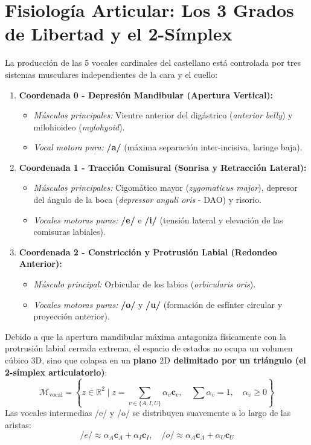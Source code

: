 \documentclass[11pt,a4paper,openany]{book}
\theoremstyle{definition}
\begin{document}
\section{Fisiología Articular: Los 3 Grados de Libertad y el 2-Símplex}
\label{sec:grados_libertad}

La producción de las 5 vocales cardinales del castellano está controlada por tres sistemas musculares independientes de la cara y el cuello:

\begin{enumerate}
    \item \textbf{Coordenada 0 - Depresión Mandibular (Apertura Vertical):}
    \begin{itemize}
        \item \textit{Músculos principales:} Vientre anterior del digástrico (\textit{anterior belly}) y milohioideo (\textit{mylohyoid}).
        \item \textit{Vocal motora pura:} \textbf{/a/} (máxima separación inter-incisiva, laringe baja).
    \end{itemize}
    \item \textbf{Coordenada 1 - Tracción Comisural (Sonrisa y Retracción Lateral):}
    \begin{itemize}
        \item \textit{Músculos principales:} Cigomático mayor (\textit{zygomaticus major}), depresor del ángulo de la boca (\textit{depressor anguli oris} - DAO) y risorio.
        \item \textit{Vocales motoras puras:} \textbf{/e/} e \textbf{/i/} (tensión lateral y elevación de las comisuras labiales).
    \end{itemize}
    \item \textbf{Coordenada 2 - Constricción y Protrusión Labial (Redondeo Anterior):}
    \begin{itemize}
        \item \textit{Músculo principal:} Orbicular de los labios (\textit{orbicularis oris}).
        \item \textit{Vocales motoras puras:} \textbf{/o/} y \textbf{/u/} (formación de esfínter circular y proyección anterior).
    \end{itemize}
\end{enumerate}

Debido a que la apertura mandibular máxima antagoniza físicamente con la protrusión labial cerrada extrema, el espacio de estados no ocupa un volumen cúbico $3\text{D}$, sino que colapsa en un \textbf{plano $2\text{D}$ delimitado por un triángulo (el 2-símplex articulatorio)}:
\begin{equation}
\mathcal{M}_{\text{vocal}} = \left\{ z \in \mathbb{R}^2 \mid z = \sum_{v \in \{A, I, U\}} \alpha_v \mathbf{c}_v, \quad \sum \alpha_v = 1, \quad \alpha_v \ge 0 \right\}
\end{equation}
Las vocales intermedias /e/ y /o/ se distribuyen suavemente a lo largo de las aristas:
$$/e/ \approx \alpha_A \mathbf{c}_A + \alpha_I \mathbf{c}_I, \quad /o/ \approx \alpha_A \mathbf{c}_A + \alpha_U \mathbf{c}_U$$
\end{document}
